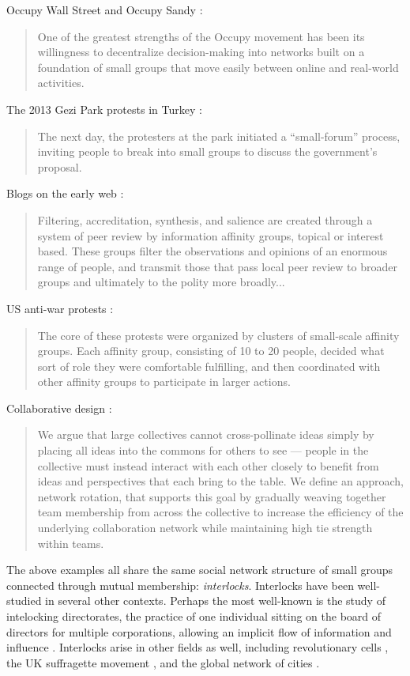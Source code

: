 \documentclass[manuscript,screen,review,acmsmall]{acmart}
\begin{document}
Occupy Wall Street and Occupy Sandy \cite{manilov_occupy_2013}:
\begin{quote}
One of the greatest strengths of the Occupy movement has been its willingness to decentralize decision-making into networks built on a foundation of small groups that move easily between online and real-world activities.
\end{quote}

The 2013 Gezi Park protests in Turkey \cite{tufekci_twitter_2017}:
\begin{quote}
The next day, the protesters at the park initiated a ``small-forum'' process,
inviting people to break into small groups to discuss the government’s proposal. 
\end{quote}

Blogs on the early web \cite{benkler_wealth_2006}:
\begin{quote}
Filtering, accreditation, synthesis, and salience are created through a system
of peer review by information affinity groups, topical or interest based.
These groups filter the observations and opinions of an enormous range of people,
and transmit those that pass local peer review to broader groups and ultimately to the polity more broadly...
\end{quote}

US anti-war protests \cite{detar_intertwinkles:_2013}:
\begin{quote}
The core of these protests were
organized by clusters of small-scale affinity groups. Each affinity
group, consisting of 10 to 20 people, decided what sort of role they
were comfortable fulfilling, and then coordinated with other affinity
groups to participate in larger actions.
\end{quote}

Collaborative design \cite{salehi_hive:_2018}:
\begin{quote}
We argue that large
collectives cannot cross-pollinate ideas simply by placing all ideas into the commons for others to
see — people in the collective must instead interact with each other closely to benefit from ideas and
perspectives that each bring to the table.
We define an approach, network rotation, that supports
this goal by gradually weaving together team membership from across the collective to increase
the efficiency of the underlying collaboration network while maintaining high tie strength within
teams.
\end{quote}

The above examples all share the same social network structure of small groups connected through mutual membership: {\em interlocks}.
Interlocks have been well-studied in several other contexts.
Perhaps the most well-known is the study of intelocking directorates,
the practice of one individual sitting on the board of directors for
multiple corporations,
allowing an implicit flow of information and influence
\cite{sapinski_interlocking_2018}.
Interlocks arise in other fields as well,
including revolutionary cells
\cite{fishcer_paul_1994, healey_using_2013},
the UK suffragette movement \cite{crossley_covert_2012},
and the global network of cities \cite{taylor_world_2015}.
\end{document}
